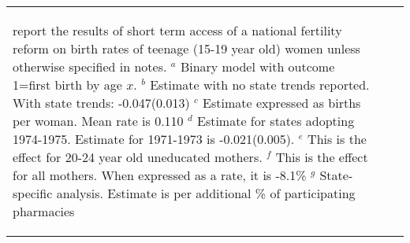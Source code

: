 \begin{table}[htpb!]
\begin{tabular}{lcl}
{\begin{footnotesize}
report the results of short term access of a national fertility reform on 
birth rates of teenage (15-19 year old) women unless otherwise specified 
in notes. \newline 
$^a$ Binary model with outcome 1=first birth by age $x$. \newline
$^b$ Estimate with no state trends reported.  With state trends: -0.047(0.013) \newline 
$^c$ Estimate expressed as births per woman.  Mean rate is 0.110 \newline 
$^d$ Estimate for states adopting 1974-1975. Estimate for 1971-1973 is 
-0.021(0.005). \newline
$^e$ This is the effect for 20-24 year old uneducated mothers. \newline
$^f$ This is the effect for all mothers.  When expressed as a rate, it is -8.1\% \newline
$^g$ State-specific analysis. Estimate is per additional \% of 
participating pharmacies
\end{footnotesize}} 
\end{tabular}
\end{table}


